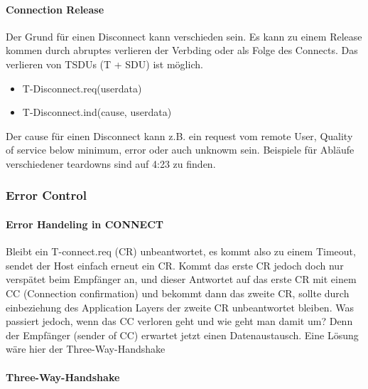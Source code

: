             \paragraph{Connection Release}
                Der Grund für einen Disconnect kann verschieden sein. Es kann zu einem Release kommen durch abruptes verlieren der Verbding oder als Folge des Connects. Das verlieren von TSDUs (T + SDU) ist möglich.
                \begin{itemize}
                    \item T-Disconnect.req(userdata)
                    \item T-Disconnect.ind(cause, userdata)
                \end{itemize}
                Der cause für einen Disconnect kann z.B. ein request vom remote User, Quality of service below minimum, error oder auch unknowm sein. Beispiele für Abläufe verschiedener teardowns sind auf 4:23 zu finden. 

        \subsubsection{Error Control}
            \paragraph{Error Handeling in CONNECT}
                Bleibt ein T-connect.req (CR) unbeantwortet, es kommt also zu einem Timeout, sendet der Host einfach erneut ein CR. Kommt das erste CR jedoch doch nur verspätet beim Empfänger an, und dieser Antwortet auf das erste CR mit einem CC (Connection confirmation) und bekommt dann das zweite CR, sollte durch einbeziehung des Application Layers der zweite CR unbeantwortet bleiben. Was passiert jedoch, wenn das CC verloren geht und wie geht man damit um? Denn der Empfänger (sender of CC) erwartet jetzt einen Datenaustausch. Eine Lösung wäre hier der Three-Way-Handshake

            \paragraph{Three-Way-Handshake}

                
